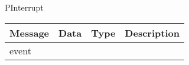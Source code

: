  {PInterrupt}

\begin{tabular}[ht]{|l|l|l|p{8cm}|}
\hline
Message & Data & Type & Description\\
\hline
event &  &  & \\
\hline
\end{tabular}
